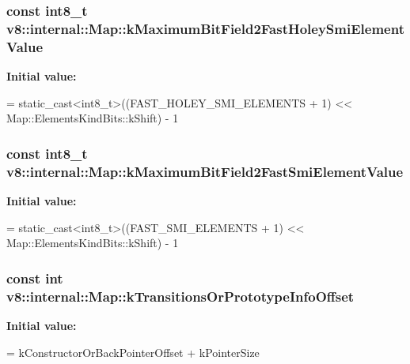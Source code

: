 \subsubsection[{\texorpdfstring{k\+Maximum\+Bit\+Field2\+Fast\+Holey\+Smi\+Element\+Value}{kMaximumBitField2FastHoleySmiElementValue}}]{\setlength{\rightskip}{0pt plus 5cm}const int8\+\_\+t v8\+::internal\+::\+Map\+::k\+Maximum\+Bit\+Field2\+Fast\+Holey\+Smi\+Element\+Value\hspace{0.3cm}{\ttfamily [static]}}\hypertarget{classv8_1_1internal_1_1_map_ab1022f42be59932c94f52f22581ea870}{}\label{classv8_1_1internal_1_1_map_ab1022f42be59932c94f52f22581ea870}
{\bfseries Initial value\+:}
\begin{DoxyCode}
=
      \textcolor{keyword}{static\_cast<}int8\_t\textcolor{keyword}{>}((FAST\_HOLEY\_SMI\_ELEMENTS + 1) <<
                          Map::ElementsKindBits::kShift) - 1
\end{DoxyCode}
\subsubsection[{\texorpdfstring{k\+Maximum\+Bit\+Field2\+Fast\+Smi\+Element\+Value}{kMaximumBitField2FastSmiElementValue}}]{\setlength{\rightskip}{0pt plus 5cm}const int8\+\_\+t v8\+::internal\+::\+Map\+::k\+Maximum\+Bit\+Field2\+Fast\+Smi\+Element\+Value\hspace{0.3cm}{\ttfamily [static]}}\hypertarget{classv8_1_1internal_1_1_map_a252325defbc9ac4d665ee6a7ef5863f4}{}\label{classv8_1_1internal_1_1_map_a252325defbc9ac4d665ee6a7ef5863f4}
{\bfseries Initial value\+:}
\begin{DoxyCode}
=
      \textcolor{keyword}{static\_cast<}int8\_t\textcolor{keyword}{>}((FAST\_SMI\_ELEMENTS + 1) <<
                          Map::ElementsKindBits::kShift) - 1
\end{DoxyCode}
\subsubsection[{\texorpdfstring{k\+Transitions\+Or\+Prototype\+Info\+Offset}{kTransitionsOrPrototypeInfoOffset}}]{\setlength{\rightskip}{0pt plus 5cm}const int v8\+::internal\+::\+Map\+::k\+Transitions\+Or\+Prototype\+Info\+Offset\hspace{0.3cm}{\ttfamily [static]}}\hypertarget{classv8_1_1internal_1_1_map_ac7fe59e9c24c17f18fa66cc3b984a482}{}\label{classv8_1_1internal_1_1_map_ac7fe59e9c24c17f18fa66cc3b984a482}
{\bfseries Initial value\+:}
\begin{DoxyCode}
=
      kConstructorOrBackPointerOffset + kPointerSize
\end{DoxyCode}



